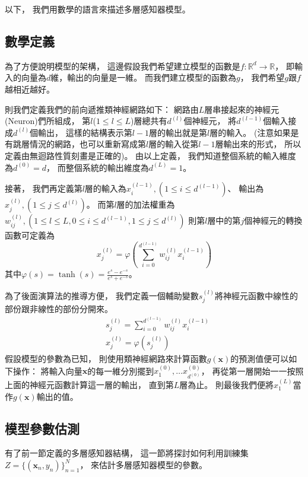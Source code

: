   以下，
  我們用數學的語言來描述多層感知器模型。
  
  \subsection{數學定義}
  為了方便說明模型的架構，
  這邊假設我們希望建立模型的函數是$f: \mathbb{R}^d \rightarrow \mathbb{R}$，
  即輸入的向量為$d$維，輸出的向量是一維。
  而我們建立模型的函數為$g$，
  我們希望$g$跟$f$越相近越好。

  則我們定義我們的前向遞推類神經網路如下：
  網路由$L$層串接起來的神經元(Neuron)們所組成，
  第$l$($1 \leq l \leq L$)層總共有$d^{(l)}$個神經元，
  將$d^{(l-1)}$個輸入接成$d^{(l)}$個輸出，
  這樣的結構表示第$l-1$層的輸出就是第$l$層的輸入。
  (注意如果是有跳層情況的網路，也可以重新寫成第$l$層的輸入從第$l-1$層輸出來的形式，
  所以定義由無迴路性質刻畫是正確的)。
  由以上定義，
  我們知道整個系統的輸入維度為$d^{(0)} = d$，
  而整個系統的輸出維度為$d^{(L)} = 1$。

  接著，
  我們再定義第$l$層的輸入為$x_i^{(l-1)}, (1 \leq i \leq d^{(l-1)})$、
  輸出為$x_j^{(l)}, (1 \leq j \leq d^{(l)})$。
  而第$l$層的加法權重為$w_{ij}^{(l)}, (1 \leq l \leq L, 0 \leq i \leq d^{(l-1)}, 1 \leq j \leq d^{(l)})$
  則第$l$層中的第$j$個神經元的轉換函數可定義為
  \begin{equation}
    x_j^{(l)} = \varphi \left( \sum_{i=0}^{d^{(l-1)}} w_{ij}^{(l)} x_i^{(l-1)} \right)
  \end{equation}
  其中$\varphi(s) = \tanh(s) = \frac{e^s - e^{-s}}{e^s + e^{-s}}$。

  為了後面演算法的推導方便，
  我們定義一個輔助變數$s_j^{(l)}$將神經元函數中線性的部份跟非線性的部份分開來。
  \begin{align}
    &s_j^{(l)} = \sum_{i=0}^{d^{(l-1)}} w_{ij}^{(l)} x_i^{(l-1)} \\
    &x_j^{(l)} = \varphi(s_j^{(l)})
  \end{align}
  假設模型的參數為已知，
  則使用類神經網路來計算函數$g(\mathbf{x})$的預測值便可以如下操作：
  將輸入向量$\mathbf{x}$的每一維分別擺到$x_1^{(0)}, \ldots x_{d^(0)}^{(0)}$，
  再從第一層開始一一按照上面的神經元函數計算這一層的輸出，
  直到第$L$層為止。
  則最後我們便將$x_1^{(L)}$當作$g(\mathbf{x})$輸出的值。

  \subsection{模型參數估測}
  有了前一節定義的多層感知器結構，
  這一節將探討如何利用訓練集$Z = \lbrace (\mathbf{x}_n, y_n) \rbrace_{n=1}^{N}$，
  來估計多層感知器模型的參數。

